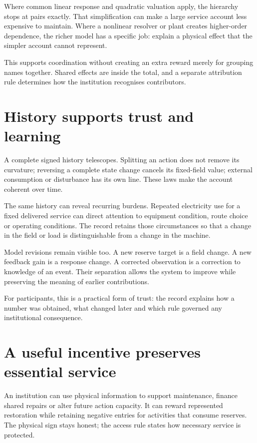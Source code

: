 Where common linear response and quadratic valuation apply, the hierarchy stops at pairs exactly. That simplification can make a large service account less expensive to maintain. Where a nonlinear resolver or plant creates higher-order dependence, the richer model has a specific job: explain a physical effect that the simpler account cannot represent.

This supports coordination without creating an extra reward merely for grouping names together. Shared effects are inside the total, and a separate attribution rule determines how the institution recognises contributors.

\section{History supports trust and learning}
A complete signed history telescopes. Splitting an action does not remove its curvature; reversing a complete state change cancels its fixed-field value; external consumption or disturbance has its own line. These laws make the account coherent over time.

The same history can reveal recurring burdens. Repeated electricity use for a fixed delivered service can direct attention to equipment condition, route choice or operating conditions. The record retains those circumstances so that a change in the field or load is distinguishable from a change in the machine.

Model revisions remain visible too. A new reserve target is a field change. A new feedback gain is a response change. A corrected observation is a correction to knowledge of an event. Their separation allows the system to improve while preserving the meaning of earlier contributions.

For participants, this is a practical form of trust: the record explains how a number was obtained, what changed later and which rule governed any institutional consequence.

\section{A useful incentive preserves essential service}
An institution can use physical information to support maintenance, finance shared repairs or alter future action capacity. It can reward represented restoration while retaining negative entries for activities that consume reserves. The physical sign stays honest; the access rule states how necessary service is protected.

